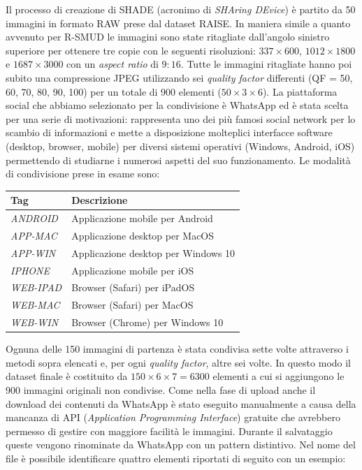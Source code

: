 Il processo di creazione di SHADE (acronimo di \textit{SHAring DEvice}) è partito da 50 immagini in formato RAW prese dal dataset RAISE. In maniera simile a quanto avvenuto per R-SMUD le immagini sono state ritagliate dall'angolo sinistro superiore per ottenere tre copie con le seguenti risoluzioni: $337\times600$, $1012\times1800$ e $1687\times3000$ con un \textit{aspect ratio} di $9:16$. Tutte le immagini ritagliate hanno poi subito una compressione JPEG utilizzando sei \textit{quality factor} differenti (QF = 50, 60, 70, 80, 90, 100) per un totale di 900 elementi ($50\times3\times6$).
La piattaforma social che abbiamo selezionato per la condivisione è WhatsApp ed è stata scelta per una serie di motivazioni: rappresenta uno dei più famosi social network per lo scambio di informazioni e mette a disposizione molteplici interfacce software (desktop, browser, mobile) per diversi sistemi operativi (Windows, Android, iOS) permettendo di studiarne i numerosi aspetti del suo funzionamento. Le modalità di condivisione prese in esame sono:\newpage

\begin{table}[h!]
    \normalsize
    \centering
    \begin{tabular}{ll}
        \textbf{Tag} & \textbf{Descrizione}\\
        \midrule
        \textit{ANDROID} & Applicazione mobile per Android\\
        \textit{APP-MAC} & Applicazione desktop per MacOS\\
        \textit{APP-WIN} & Applicazione desktop per Windows 10\\
        \textit{IPHONE} & Applicazione mobile per iOS\\
        \textit{WEB-IPAD} & Browser (Safari) per iPadOS\\
        \textit{WEB-MAC} & Browser (Safari) per MacOS\\
        \textit{WEB-WIN} & Browser (Chrome) per Windows 10\\
    \end{tabular}
\end{table}

Ognuna delle 150 immagini di partenza è stata condivisa sette volte attraverso i metodi sopra elencati e, per ogni \textit{quality factor}, altre sei volte. In questo modo il dataset finale è costituito da $150\times6\times7 = 6300$ elementi a cui si aggiungono le 900 immagini originali non condivise. 
Come nella fase di upload anche il download dei contenuti da WhatsApp è stato eseguito manualmente a causa della mancanza di API (\textit{Application Programming Interface}) gratuite che avrebbero permesso di gestire con maggiore facilità le immagini.  Durante il salvataggio queste vengono rinominate da WhatsApp con un pattern distintivo. Nel nome del file è possibile identificare quattro elementi riportati di seguito con un esempio:

